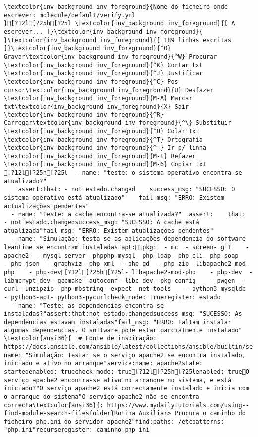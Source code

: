 \documentclass{scrartcl}
\begin{document}
\begin{Verbatim}
\textcolor{inv_background inv_foreground}{Nome do ficheiro onde escrever: molecule/default/verify.yml                                                                               }[?12l[?25h[?25l \textcolor{inv_background inv_foreground}{[ A escrever... ]}\textcolor{inv_background inv_foreground}{          }\textcolor{inv_background inv_foreground}{[ 189 linhas escritas ]}\textcolor{inv_background inv_foreground}{^O} Gravar\textcolor{inv_background inv_foreground}{^W} Procurar      \textcolor{inv_background inv_foreground}{^K} Cortar txt    \textcolor{inv_background inv_foreground}{^J} Justificar    \textcolor{inv_background inv_foreground}{^C} Pos cursor\textcolor{inv_background inv_foreground}{U} Desfazer     \textcolor{inv_background inv_foreground}{M-A} Marcar txt\textcolor{inv_background inv_foreground}{X} Sair    \textcolor{inv_background inv_foreground}{^R} Carregar\textcolor{inv_background inv_foreground}{^\} Substituir    \textcolor{inv_background inv_foreground}{^U} Colar txt     \textcolor{inv_background inv_foreground}{^T} Ortografia    \textcolor{inv_background inv_foreground}{^_} Ir p/ linha   \textcolor{inv_background inv_foreground}{M-E} Refazer      \textcolor{inv_background inv_foreground}{M-6} Copiar txt
[?12l[?25h[?25l  - name: "teste: o sistema operativo encontra-se atualizado?"
    assert:that: - not estado.changed    success_msg: "SUCESSO: O sistema operativo está atualizado"    fail_msg: "ERRO: Existem actualizações pendentes"
  - name: "Teste: a cache encontra-se atualizada?"  assert:    that:  - not estado.changedsuccess_msg: "SUCESSO: A cache está atualizada"fail_msg: "ERRO: Existem atualizações pendentes"
  - name: "Simulação: testa se as aplicações dependencia do software leantime se encontram instaladas"apt:pkg:  - mc  - screen- git    - apache2  - mysql-server- phpphp-mysql- php-ldap- php-cli- php-soap    - php-json  - graphviz- php-xml  - php-gd  - php-zip- libapache2-mod-php    - php-dev[?12l[?25h[?25l- libapache2-mod-php    - php-dev  - libmcrypt-dev- gccmake- autoconf- libc-dev- pkg-config    - pwgen  - curl- unzipzip- php-mbstring- expect- net-tools    - python3-mysqldb  - python3-apt- python3-pycurlcheck_mode: trueregister: estado
  - name: "Teste: as dependencias encontra-se instaladas?"assert:that:not estado.changedsuccess_msg: "SUCESSO: As dependencias estavam instaladas"fail_msg: "ERRO: Faltam instalar algumas dependencias. O software pode estar parcialmente instalado"
\textcolor{ansi36}{  # Fonte de inspiração: https://docs.ansible.com/ansible/latest/collections/ansible/builtin/service_module.html}- name: "Simulação: Testar se o serviço apache2 se encontra instalado, iniciado e ativo no arranque"service:name: apache2state: startedenabled: truecheck_mode: true[?12l[?25h[?25lenabled: trueO serviço apache2 encontra-se ativo no arranque no sistema, e está iniciado?"O serviço apache2 está correctamente instalado e inicia com o arranque do sistema"O serviço apache2 não se encontra correcta\textcolor{ansi36}{: https://www.mydailytutorials.com/using--find-module-search-filesfolder}Rotina Auxiliar> Procura o caminho do ficheiro php.ini do servidor apache2"find:paths: /etcpatterns: "php.ini"recurseregister: caminho_php_ini

\end{Verbatim}
\end{document}

